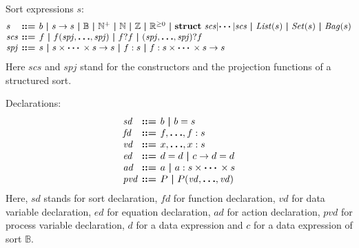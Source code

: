\documentclass[a4paper,fleqn]{article}
\makeatletter
\newenvironment{tightarray}[1]
  {\setlength{\arraycolsep}{2pt}%
   \begin{array}{@{}#1@{}}%
  }
  {\end{array}%
  }
\newcommand{\f}[1]{\ensuremath{\mathit{#1}}}
\newcommand{\bool}{\ensuremath{\mathbb{B}}}
\newcommand{\nat}{\ensuremath{\mathbb{N}}}
\newcommand{\pos}{\ensuremath{\nat^{+}}}
\newcommand{\tint}{\ensuremath{\mathbb{Z}}}
\newcommand{\nnreal}{\ensuremath{\mathbb{R}^{\geq 0}}}
\newcommand{\mb}[1]{\text{\boldmath$#1$}}%
\newlength{\tlength}
\newcommand{\kwstruct}{{\bf struct}}
\makeatother
\begin{document}
Sort expressions $s$:
\[\begin{tightarray}{lcl}
s      & \mb{::=} & b\ \mb{|}\ s \to s\ \mb{|}\ 
               \bool\ \mb{|}\ \pos\ \mb{|}\ \nat\ \mb{|}\ \tint\ \mb{|}\ \nnreal\ \mb{|}\ 
               \kwstruct\ \f{scs} | \mb{\cdots} | \f{scs}\ \mb{|}\ 
               \f{List}(s)\ \mb{|}\ \f{Set}(s)\ \mb{|}\ \f{Bag}(s)\\
\f{scs} & \mb{::=} & f\ \mb{|}\ f(\f{spj},\mb{\ldots},\f{spj})\ \mb{|}\ 
                f ? f\ \mb{|}\ \f(\f{spj},\mb{\ldots},\f{spj})?f \\
\f{spj} & \mb{::=} & s\ \mb{|}\ s \times \mb{\cdots} \times s \to s\ \mb{|}\ 
                f: s\ \mb{|}\ f: s \times \mb{\cdots} \times s \to s
\end{tightarray}\]
Here $\f{scs}$ and $\f{spj}$ stand for the constructors and the projection
functions of a structured sort.

Declarations:
\[\begin{tightarray}{lcl}
\f{sd}  & \mb{::=} & b\ \mb{|}\ b = s\\
\f{fd}  & \mb{::=} & f, \mb{\ldots}, f: s\\
\f{vd}  & \mb{::=} & x,\mb{\ldots},x: s\\
\f{ed}  & \mb{::=} & d = d\ \mb{|}\ c \to d = d\\
\f{ad}  & \mb{::=} & a\ \mb{|}\ a: s \times \mb{\cdots} \times s\\
\f{pvd} & \mb{::=} & P\ \mb{|}\ P(\f{vd},\mb{\ldots},\f{vd})\\
\end{tightarray}\]
Here, $\f{sd}$ stands for sort declaration, $\f{fd}$ for function declaration,
$\f{vd}$ for data variable declaration, $\f{ed}$ for equation declaration,
$\f{ad}$ for action declaration, $\f{pvd}$ for process variable declaration,
$d$ for a data expression and $c$ for a data expression of sort $\bool$.
\end{document}
